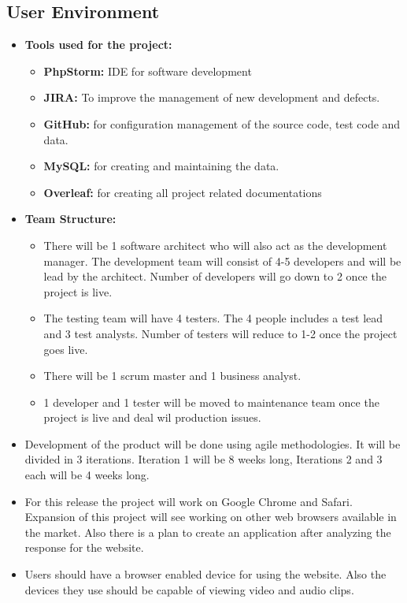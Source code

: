 \documentclass{report}
\begin{document}
\subsection{User Environment}
\begin{itemize}
    \item\textbf{Tools used for the project:}
    \begin{itemize}
        \item \textbf{PhpStorm:} IDE for software development
        \item \textbf{JIRA:} To improve the management of new development and defects.
        \item \textbf{GitHub:} for configuration management of the source code, test code and data.
        \item \textbf{MySQL:} for creating and maintaining the data.
        \item \textbf{Overleaf:} for creating all project related documentations
    \end{itemize}
    \item\textbf{Team Structure:}
    \begin{itemize}
        \item There will be 1 software architect who will also act as the development manager. The development team will consist of 4-5 developers and will be lead by the architect. Number of developers will go down to 2 once the project is live.
        \item The testing team will have 4 testers. The 4 people includes a test lead and 3 test analysts. Number of testers will reduce to 1-2 once the project goes live.
        \item There will be 1 scrum master and 1 business analyst.
        \item 1 developer and 1 tester will be moved to maintenance team once the project is live and deal wil production issues. 
    \end{itemize}
    \item Development of the product will be done using agile methodologies. It will be divided in 3 iterations. Iteration 1 will be 8 weeks long, Iterations 2 and 3 each will be 4 weeks long.
    \item For this release the project will work on Google Chrome and Safari. Expansion of this project will see working on other web browsers available in the market. Also there is a plan to create an application after analyzing the response for the website.
    \item Users should have a browser enabled device for using the website. Also the devices they use should be capable of viewing video and audio clips.

\end{itemize}
\end{document}
